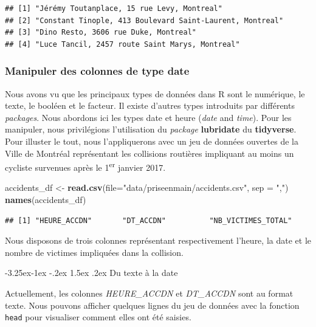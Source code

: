 \documentclass[
  11pt,
  french,
]{book}
\makeatletter
\newenvironment{Shaded}{\begin{snugshade}}{\end{snugshade}}
\newcommand{\DataTypeTok}[1]{\textcolor[rgb]{0.13,0.29,0.53}{#1}}
\newcommand{\KeywordTok}[1]{\textcolor[rgb]{0.13,0.29,0.53}{\textbf{#1}}}
\newcommand{\NormalTok}[1]{#1}
\newcommand{\StringTok}[1]{\textcolor[rgb]{0.31,0.60,0.02}{#1}}
\newenvironment{kframe}{%
\medskip{}
\setlength{\fboxsep}{.8em}
 \def\at@end@of@kframe{}%
 \ifinner\ifhmode%
  \def\at@end@of@kframe{\end{minipage}}%
  \begin{minipage}{\columnwidth}%
 \fi\fi%
 \def\FrameCommand##1{\hskip\@totalleftmargin \hskip-\fboxsep
 \colorbox{shadecolor}{##1}\hskip-\fboxsep
     \hskip-\linewidth \hskip-\@totalleftmargin \hskip\columnwidth}%
 \MakeFramed {\advance\hsize-\width
   \@totalleftmargin\z@ \linewidth\hsize
   \@setminipage}}%
 {\par\unskip\endMakeFramed%
 \at@end@of@kframe}
\renewenvironment{Shaded}{\begin{kframe}}{\end{kframe}}
\renewcommand\paragraph{\@startsection{paragraph}{4}{\z@}%
   {-3.25ex\@plus -1ex \@minus -.2ex}%
   {1.5ex \@plus .2ex}%
   {\normalfont\normalsize\bfseries}}
\makeatother
\begin{document}
\begin{verbatim}
## [1] "Jérémy Toutanplace, 15 rue Levy, Montreal"              
## [2] "Constant Tinople, 413 Boulevard Saint-Laurent, Montreal"
## [3] "Dino Resto, 3606 rue Duke, Montreal"                    
## [4] "Luce Tancil, 2457 route Saint Marys, Montreal"
\end{verbatim}

\hypertarget{sect01426}{%
\subsubsection{Manipuler des colonnes de type date}\label{sect01426}}

Nous avons vu que les principaux types de données dans R sont le numérique, le texte, le booléen et le facteur. Il existe d'autres types introduits par différents \emph{packages}. Nous abordons ici les types date et heure (\emph{date} and \emph{time}). Pour les manipuler, nous privilégions l'utilisation du \emph{package} \textbf{lubridate} du \textbf{tidyverse}. Pour illuster le tout, nous l'appliquerons avec un jeu de données ouvertes de la Ville de Montréal représentant les collisions routières impliquant au moins un cycliste survenues après le 1\textsuperscript{er} janvier 2017.

\begin{Shaded}
\begin{Highlighting}[]
\NormalTok{accidents_df <-}\StringTok{ }\KeywordTok{read.csv}\NormalTok{(}\DataTypeTok{file=}\StringTok{"data/priseenmain/accidents.csv"}\NormalTok{, }\DataTypeTok{sep =} \StringTok{","}\NormalTok{)}
\KeywordTok{names}\NormalTok{(accidents_df)}
\end{Highlighting}
\end{Shaded}

\begin{verbatim}
## [1] "HEURE_ACCDN"       "DT_ACCDN"          "NB_VICTIMES_TOTAL"
\end{verbatim}

Nous disposons de trois colonnes représentant respectivement l'heure, la date et le nombre de victimes impliquées dans la collision.

\hypertarget{sect014261}{%
\paragraph{Du texte à la date}\label{sect014261}}

Actuellement, les colonnes \emph{HEURE\_ACCDN} et \emph{DT\_ACCDN} sont au format texte. Nous pouvons afficher quelques lignes du jeu de données avec la fonction \texttt{head} pour visualiser comment elles ont été saisies.
\end{document}

